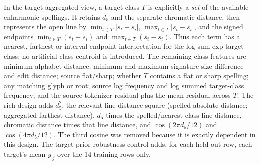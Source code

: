 \documentclass[11pt]{article}
\begin{document}
In the target-aggregated view, a target class $T$ is explicitly a \emph{set} of the available enharmonic spellings. It retains $d_5$ and the separate chromatic distance, then represents the open line by $\min_{t\in T}|s_t-s_i|$, $\max_{t\in T}|s_t-s_i|$, and the signed endpoints $\min_{t\in T}(s_t-s_i)$ and $\max_{t\in T}(s_t-s_i)$. Thus each term has a nearest, farthest or interval-endpoint interpretation for the log-sum-exp target class; no artificial class centroid is introduced. The remaining class features are minimum alphabet distance; minimum and maximum signature-size difference and edit distance; source flat/sharp; whether $T$ contains a flat or sharp spelling; any matching glyph or root; source log frequency and log summed target-class frequency; and the source tokenizer residual plus the mean residual across $T$. The rich design adds $d_5^2$, the relevant line-distance square (spelled absolute distance; aggregated farthest distance), $d_5$ times the spelled/nearest class line distance, chromatic distance times that line distance, and $\cos(2\pi d_5/12)$ and $\cos(4\pi d_5/12)$. The third cosine was removed because it is exactly dependent in this design. The target-prior robustness control adds, for each held-out row, each target's mean $y_{\cdot j}$ over the 14 training rows only.
\end{document}
